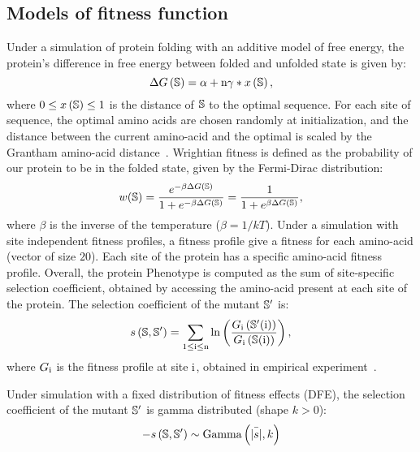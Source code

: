 \subsection{Models of fitness function}
\label{MatMet:folding}

Under a simulation of protein folding with an additive model of free energy, the protein's difference in free energy between folded and unfolded state is given by:
\begin{equation*}
    \Delta G\left(\mathbb{S}\right) = \alpha + \text{n} \gamma * x\left(\mathbb{S}\right),
\end{equation*}
where $0 \leq x\left(\mathbb{S}\right) \leq 1$ is the distance of $\mathbb{S}$ to the optimal sequence.
For each site of sequence, the optimal amino acids are chosen randomly at initialization, and the distance between the current amino-acid and the optimal is scaled by the Grantham amino-acid distance~\citep{Grantham1974}.
Wrightian fitness is defined as the probability of our protein to be in the folded state, given by the Fermi-Dirac distribution:
\begin{equation}
    w (\mathbb{S}) = \dfrac{e^{-\beta \Delta G\left(\mathbb{S}\right) }}{1 + e^{-\beta \Delta G\left(\mathbb{S}\right) }} = \dfrac{1}{1 + e^{\beta \Delta G\left(\mathbb{S}\right) }},
\end{equation}
where $\beta$ is the inverse of the temperature ($\beta=1/kT$).
Under a simulation with site independent fitness profiles, a fitness profile give a fitness for each amino-acid (vector of size $20$).
Each site of the protein has a specific amino-acid fitness profile.
Overall, the protein \gls{Phenotype} is computed as the sum of site-specific selection coefficient, obtained by accessing the amino-acid present at each site of the protein.
The selection coefficient of the mutant $\mathbb{S}'$ is:
\begin{equation}
    s \left( \mathbb{S},\mathbb{S}'\right) = \sum\limits_{1 \leq \text{i} \leq \text{n}} \ln \left( \dfrac{G_{\text{i}} \left(\mathbb{S}'(\text{i}) \right)}{G_{\text{i}} \left(\mathbb{S}(\text{i}) \right)} \right) ,
\end{equation}
where $G_{\text{i}}$ is the fitness profile at site $\text{i}$, obtained in empirical experiment~\citep{Bloom2017}.

Under simulation with a fixed distribution of fitness effects (\acrshort{DFE}), the selection coefficient of the mutant $\mathbb{S}'$ is gamma distributed (shape $k > 0$):
\begin{equation}
    - s \left( \mathbb{S},\mathbb{S}'\right) \sim \text{Gamma} \left( \bar{|s|}, k \right)
\end{equation}

